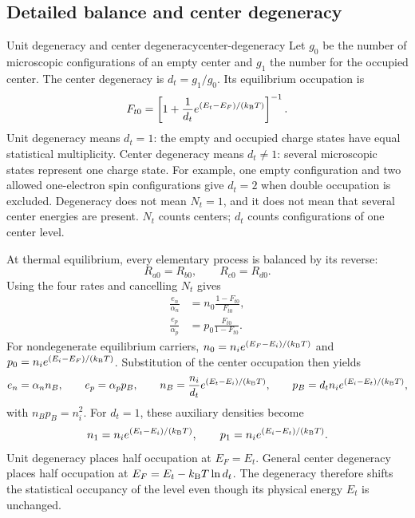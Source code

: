 \subsection{Detailed balance and center degeneracy}

\begin{definition}{Unit degeneracy and center degeneracy}{center-degeneracy}
Let $g_0$ be the number of microscopic configurations of an empty center and
$g_1$ the number for the occupied center.  The center degeneracy is
$d_t=g_1/g_0$.  Its equilibrium occupation is
\[
  F_{t0}
  =\left[
  1+\frac{1}{d_t}
  e^{(E_t-E_F)/(k_{\mathrm B} T)}
  \right]^{-1}.
\]
Unit degeneracy means $d_t=1$: the empty and occupied charge states have equal
statistical multiplicity.  Center degeneracy means $d_t\ne1$: several
microscopic states represent one charge state.  For example, one empty
configuration and two allowed one-electron spin configurations give $d_t=2$
when double occupation is excluded.  Degeneracy does not mean $N_t=1$, and it
does not mean that several center energies are present.  $N_t$ counts centers;
$d_t$ counts configurations of one center level.
\end{definition}

At thermal equilibrium, every elementary process is balanced by its reverse:
\begin{equation}
  R_{a0}=R_{b0},
  \qquad
  R_{c0}=R_{d0}.
  \label{eq:srh-elementary-detailed-balance}
\end{equation}
Using the four rates and cancelling $N_t$ gives
\begin{align}
  \frac{e_n}{\alpha_n}
  &=n_0\frac{1-F_{t0}}{F_{t0}},\\
  \frac{e_p}{\alpha_p}
  &=p_0\frac{F_{t0}}{1-F_{t0}}.
  \label{eq:srh-emission-from-detailed-balance}
\end{align}
For nondegenerate equilibrium carriers,
$n_0=n_i e^{(E_F-E_i)/(k_{\mathrm B} T)}$ and
$p_0=n_i e^{(E_i-E_F)/(k_{\mathrm B} T)}$.  Substitution of the center occupation then
yields
\begin{equation}
  e_n=\alpha_n n_B,
  \qquad
  e_p=\alpha_p p_B,
  \qquad
  n_B=\frac{n_i}{d_t}e^{(E_t-E_i)/(k_{\mathrm B} T)},
  \qquad
  p_B=d_tn_i e^{(E_i-E_t)/(k_{\mathrm B} T)},
  \label{eq:srh-emission-and-degeneracy-densities}
\end{equation}
with $n_Bp_B=n_i^2$.  For $d_t=1$, these auxiliary densities become
\begin{equation}
  n_1=n_i e^{(E_t-E_i)/(k_{\mathrm B} T)},
  \qquad
  p_1=n_i e^{(E_i-E_t)/(k_{\mathrm B} T)}.
  \label{eq:srh-unit-degeneracy-densities}
\end{equation}
Unit degeneracy places half occupation at $E_F=E_t$.  General center degeneracy
places half occupation at $E_F=E_t-k_{\mathrm B} T\ln d_t$.  The degeneracy therefore
shifts the statistical occupancy of the level even though its physical energy
$E_t$ is unchanged.

